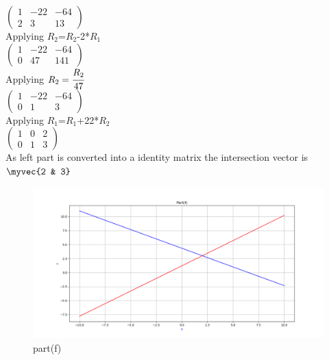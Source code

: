 $\begin{pmatrix}
1 & -22 & -64\\
2 & 3 & 13
\end{pmatrix}$\\

Applying $R_{2}$=$R_{2}$-2*$R_{1}$\\

$\begin{pmatrix}
1 & -22 & -64\\
0 & 47 & 141
\end{pmatrix}$\\

Applying $R_{2}=\cfrac{R_{2}}{47}$\\

$\begin{pmatrix}
1 & -22 & -64\\
0 & 1 & 3
\end{pmatrix}$\\

Applying $R_{1}$=$R_{1}$+22*$R_{2}$\\

$\begin{pmatrix}
1 & 0 & 2\\
0 & 1 & 3
\end{pmatrix}$\\

As left part is converted into a identity matrix the intersection vector is $\myvec{2 & 3}$\\

\renewcommand{\thefigure}{\theenumi.\arabic{figure}}
\begin{figure}[!ht]
    \centering
    \includegraphics[width=\columnwidth]{./figures/A1_partf}
\caption{part(f)}
\label{fig: part(f)}
\end{figure}


